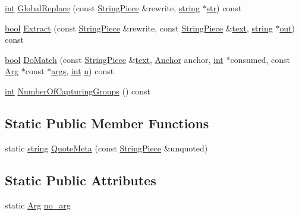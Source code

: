 \begin{DoxyCompactItemize}
\item 
\hyperlink{pcre_8txt_a42dfa4ff673c82d8efe7144098fbc198}{int} \hyperlink{classpcrecpp_1_1RE_af176aba1f71bf5df3d05c7d736d39904}{Global\+Replace} (const \hyperlink{classpcrecpp_1_1StringPiece}{String\+Piece} \&rewrite, \hyperlink{pcre_8txt_ad52baeed02a03dda73cbe504945c9c35}{string} $\ast$\hyperlink{group__APR__Util__Bucket__Brigades_ga6a62b60443be1d042194af15ce934193}{str}) const 
\item 
\hyperlink{aplibtool_8c_ad5c9d4ba3dc37783a528b0925dc981a0}{bool} \hyperlink{classpcrecpp_1_1RE_abe0025cd14cd33cf575dc54a74771cb5}{Extract} (const \hyperlink{classpcrecpp_1_1StringPiece}{String\+Piece} \&rewrite, const \hyperlink{classpcrecpp_1_1StringPiece}{String\+Piece} \&\hyperlink{pcretest_8txt_ad4baa4bf79e72e8b68dcaf4f273f8d7f}{text}, \hyperlink{pcre_8txt_ad52baeed02a03dda73cbe504945c9c35}{string} $\ast$\hyperlink{apr__sha1_8h_acc4166708bf1c388b137e1861496523e}{out}) const 
\item 
\hyperlink{aplibtool_8c_ad5c9d4ba3dc37783a528b0925dc981a0}{bool} \hyperlink{classpcrecpp_1_1RE_aaafe0f3a68a3f754234efc814f8d2f9a}{Do\+Match} (const \hyperlink{classpcrecpp_1_1StringPiece}{String\+Piece} \&\hyperlink{pcretest_8txt_ad4baa4bf79e72e8b68dcaf4f273f8d7f}{text}, \hyperlink{classpcrecpp_1_1RE_aafe8a162d00ec7a7d6d2ba67652735ef}{Anchor} anchor, \hyperlink{pcre_8txt_a42dfa4ff673c82d8efe7144098fbc198}{int} $\ast$consumed, const \hyperlink{classpcrecpp_1_1Arg}{Arg} $\ast$const $\ast$\hyperlink{group__APR__Util__DBD_ga6b6dfca544bdc17e0e73e3ca56c2363d}{args}, \hyperlink{pcre_8txt_a42dfa4ff673c82d8efe7144098fbc198}{int} \hyperlink{pcregrep_8txt_ab232d334efb9173a12ae2940d035f460}{n}) const 
\item 
\hyperlink{pcre_8txt_a42dfa4ff673c82d8efe7144098fbc198}{int} \hyperlink{classpcrecpp_1_1RE_a1370a953ba9dcab3da0c256341f75e4c}{Number\+Of\+Capturing\+Groups} () const 
\end{DoxyCompactItemize}
\subsection*{Static Public Member Functions}
\begin{DoxyCompactItemize}
\item 
static \hyperlink{pcre_8txt_ad52baeed02a03dda73cbe504945c9c35}{string} \hyperlink{classpcrecpp_1_1RE_a3a17dc4f50b3ece6a095e0344bb6acdc}{Quote\+Meta} (const \hyperlink{classpcrecpp_1_1StringPiece}{String\+Piece} \&unquoted)
\end{DoxyCompactItemize}
\subsection*{Static Public Attributes}
\begin{DoxyCompactItemize}
\item 
static \hyperlink{classpcrecpp_1_1Arg}{Arg} \hyperlink{classpcrecpp_1_1RE_a596c7c964ad0e41415540e12ee73d302}{no\+\_\+arg}
\end{DoxyCompactItemize}


